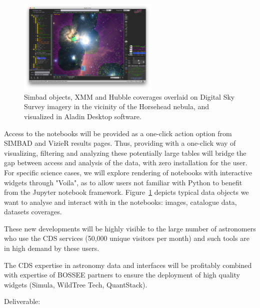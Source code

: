 \begin{task}[
  title=Astronomy application,
  id=astro,
  lead=CDS,
  PM=18,
  wphases={18-42},
  partners={QS,WTT,SRL,INSERM,XFEL}
]
\begin{figure}[ht!]\centering
  \includegraphics[width=0.6\textwidth]{astro-aladin-snapshot}
  \caption{Simbad objects, XMM and Hubble coverages overlaid on Digital Sky Survey imagery in the vicinity of the Horsehead nebula, and visualized in Aladin Desktop software.}\label{fig:astro-aladin-snapshot}
\end{figure}

  Access to the notebooks will be provided as a one-click action option from
  SIMBAD and VizieR results pages.
  Thus, providing with a one-click way of visualizing, filtering and analyzing
these potentially large tables will bridge the gap between access and analysis
of the data, with zero installation for the user.
  For specific science cases, we will explore rendering of notebooks with 
  interactive widgets through "Voila", as to allow users not familiar with 
  Python to benefit from the Jupyter notebook framework.
  Figure~\ref{fig:astro-aladin-snapshot} depicts typical data objects we want to analyse and interact with in the notebooks: images, catalogue data, datasets coverages.

  These new developments will be highly visible to the large number of astronomers who use the CDS services (50,000 unique visitors per month) and such tools are in high demand by these users.

  The CDS expertise in astronomy data and interfaces will be profitably combined with expertise of BOSSEE partners to ensure the deployment of high quality widgets (Simula, WildTree Tech, QuantStack).



Deliverable: 


\end{task}

